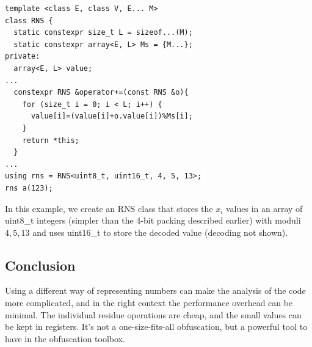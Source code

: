 \documentclass[twocolumn]{article}
\begin{document}
\begin{verbatim}
template <class E, class V, E... M>
class RNS {
  static constexpr size_t L = sizeof...(M);
  static constexpr array<E, L> Ms = {M...};
private:
  array<E, L> value;
...
  constexpr RNS &operator+=(const RNS &o){
    for (size_t i = 0; i < L; i++) {
      value[i]=(value[i]+o.value[i])%Ms[i];
    }
    return *this;
  }
...
using rns = RNS<uint8_t, uint16_t, 4, 5, 13>;
rns a(123);
\end{verbatim}

In this example, we create an RNS class that stores the $x_i$ values in an array of uint8\_t integers (simpler than the 4-bit packing described earlier) with moduli $4, 5, 13$ and uses uint16\_t to store the decoded value (decoding not shown).

\vspace*{-0.5\baselineskip}
\subsection*{Conclusion}

Using a different way of representing numbers can make the analysis of the code more complicated, and in the right context the performance overhead can be minimal. The individual residue operations are cheap, and the small values can be kept in registers. It's not a one-size-fits-all obfuscation, but a powerful tool to have in the obfuscation toolbox.


\end{document}
